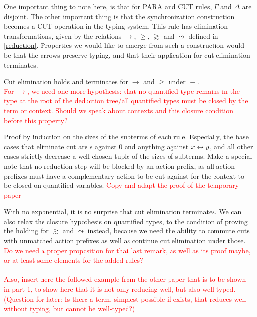 \begin{definition}
{}
\end{definition}

One important thing to note here, is that for PARA and CUT rules, $\Gamma$ and $\Delta$ are disjoint. The other important thing is that the synchronization construction becomes a CUT operation in the typing system. This rule has elimination transformations, given by the relations $\to$, $\geq$, $\gtrsim$ and $\leadsto$ defined in \ref{reduction}. Properties we would like to emerge from such a construction would be that the arrows preserve typing, and that their application for cut elimination terminates.

\begin{proposition}
Cut elimination holds and terminates for $\to$ and $\geq$ under $\equiv$.\\
\textcolor{red}{For $\to$, we need one more hypothesis: that no quantified type remains in the type at the root of the deduction tree/all quantified types must be closed by the term or context. Should we speak about contexts and this closure condition before this property?} %
\end{proposition}

\begin{myproof}
Proof by induction on the sizes of the subterms of each rule. Especially, the base cases that eliminate cut are $\epsilon$ against 0 and anything against $x \leftrightarrow y$, and all other cases strictly decrease a well chosen tuple of the sizes of subterms. Make a special note that no reduction step will be blocked by an action prefix, as all action prefixes must have a complementary action to be cut against for the context to be closed on quantified variables. \textcolor{red}{Copy and adapt the proof of the temporary paper} %
\end{myproof}

\remark With no exponential, it is no surprise that cut elimination terminates. We can also relax the closure hypothesis on quantified types, to the condition of proving the holding for $\gtrsim$ and $\leadsto$ instead, because we need the ability to commute cuts with unmatched action prefixes as well as continue cut elimination under those.\\

\textcolor{red}{Do we need a proper proposition for that last remark, as well as its proof maybe, or at least some elements for the added rules?\\~\\
Also, insert here the followed example from the other paper that is to be shown in part 1, to show here that it is not only reducing well, but also well-typed. (Question for later: Is there a term, simplest possible if exists, that reduces well without typing, but cannot be well-typed?)}